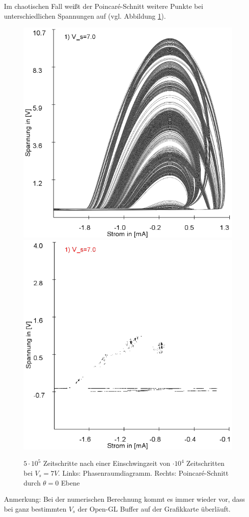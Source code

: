 \documentclass{scrartcl}
\begin{document}
 Im chaotischen Fall weißt der Poincaré-Schnitt weitere Punkte bei unterschiedlichen Spannungen auf (vgl. Abbildung \ref{fig:ldr-poin2}).
\begin{figure}[!htbp]
\includegraphics[scale=0.4]{schwing-500k-nach-10k-7V-phase}
\includegraphics[scale=0.4]{schwing-500k-nach-10k-7V-poin}
\caption{$5\cdot10^5$ Zeitschritte nach einer Einschwingzeit von $\cdot10^4$ Zeitschritten bei $V_s=7V$. Links: Phasenraumdiagramm. Rechts: Poincaré-Schnitt durch $\theta=0$ Ebene}
\label{fig:ldr-poin2}
\end{figure}
Anmerkung: Bei der numerischen Berechnung  kommt es immer wieder vor, dass bei ganz bestimmten $V_s$ der Open-GL Buffer auf der Grafikkarte überläuft.
\end{document}

